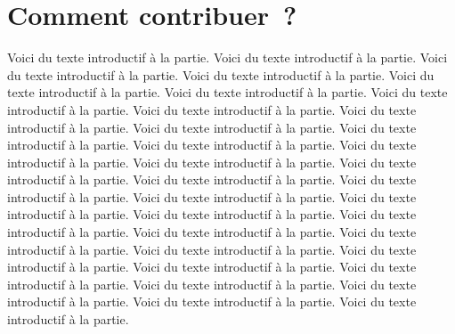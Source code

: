 \section{Comment contribuer~?}
Voici du texte introductif à la partie.
Voici du texte introductif à la partie.
Voici du texte introductif à la partie.
Voici du texte introductif à la partie.
Voici du texte introductif à la partie.
Voici du texte introductif à la partie.
Voici du texte introductif à la partie.
Voici du texte introductif à la partie.
Voici du texte introductif à la partie.
Voici du texte introductif à la partie.
Voici du texte introductif à la partie.
Voici du texte introductif à la partie.
Voici du texte introductif à la partie.
Voici du texte introductif à la partie.
Voici du texte introductif à la partie.
Voici du texte introductif à la partie.
Voici du texte introductif à la partie.
Voici du texte introductif à la partie.
Voici du texte introductif à la partie.
Voici du texte introductif à la partie.
Voici du texte introductif à la partie.
Voici du texte introductif à la partie.
Voici du texte introductif à la partie.
Voici du texte introductif à la partie.
Voici du texte introductif à la partie.
Voici du texte introductif à la partie.
Voici du texte introductif à la partie.
Voici du texte introductif à la partie.
Voici du texte introductif à la partie.
Voici du texte introductif à la partie.
Voici du texte introductif à la partie.
